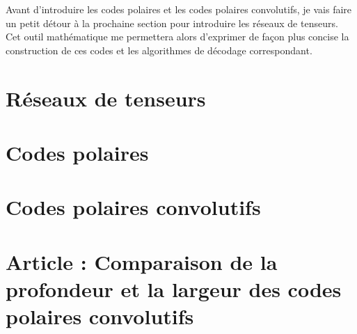 Avant d'introduire les codes polaires et les codes polaires convolutifs,
je vais faire un petit détour à la prochaine section pour introduire les réseaux de tenseurs.
Cet outil mathématique me permettera alors d'exprimer de façon plus concise la construction
de ces codes et les algorithmes de décodage correspondant.

\section{Réseaux de tenseurs}




\section{Codes polaires}

\section{Codes polaires convolutifs}

\section{Article : Comparaison de la profondeur et la largeur des codes polaires convolutifs}
